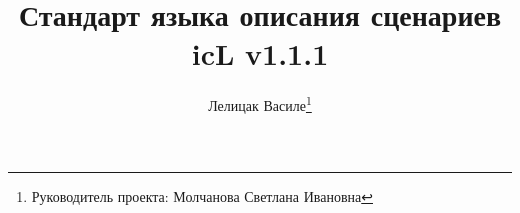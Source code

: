 \documentclass[a4paper, 14pt]{extarticle}
\begin{document}





\title{Стандарт языка описания сценариев icL v1.1.1}
\author{Лелицак Василе\thanks{Руководитель проекта: Молчанова Светлана Ивановна}}


\renewcommand{\contentsname}{\textsf{Оглавление}}\makeatletter
\renewcommand{\l@section}{\@dottedtocline{1}{1.5em}{2.6em}}
\renewcommand{\l@subsection}{\@dottedtocline{2}{4.0em}{3.6em}}
\renewcommand{\l@subsubsection}{\@dottedtocline{3}{7.4em}{4.5em}}
\makeatother
\tableofcontents
\end{document}
